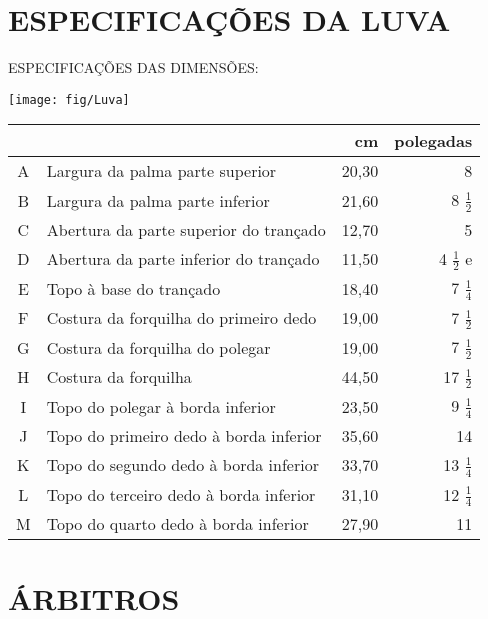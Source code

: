 \chapter{ESPECIFICAÇÕES DA LUVA} \label{chap:Luva}

ESPECIFICAÇÕES DAS DIMENSÕES: 

\begin{center}
	\texttt{[image: fig/Luva]}
	
	
	\begin{tabular}{c |p{90mm}|r|r}
		&&cm& polegadas \\\hline\hline
		A& Largura da palma parte superior &20,30& 8  \\\hline
		B& Largura da palma parte inferior &21,60& 8 $\frac{1}{2}$ \\\hline 
		C& Abertura da parte superior do trançado &12,70 &5  \\\hline
		D& Abertura da parte inferior do trançado &11,50 &4 $\frac{1}{2}$  e\\\hline
		E& Topo à base do trançado &18,40& 7 $\frac{1}{4}$  \\\hline
		F& Costura da forquilha do primeiro dedo &19,00 &7 $\frac{1}{2}$  \\\hline
		G& Costura da forquilha do polegar &19,00& 7 $\frac{1}{2}$ \\\hline 
		H& Costura da forquilha &44,50& 17 $\frac{1}{2}$  \\\hline
		I& Topo do polegar à borda inferior &23,50 &9 $\frac{1}{4}$  \\\hline
		J& Topo do primeiro dedo à borda inferior &35,60 &14  \\\hline
		K& Topo do segundo dedo à borda inferior &33,70 &13 $\frac{1}{4}$  \\\hline
		L& Topo do terceiro dedo à borda inferior& 31,10& 12 $\frac{1}{4}$  \\\hline
		M& Topo do quarto dedo à borda inferior& 27,90 &11  \\\hline
	\end{tabular}  
\end{center}


\chapter{ÁRBITROS}



